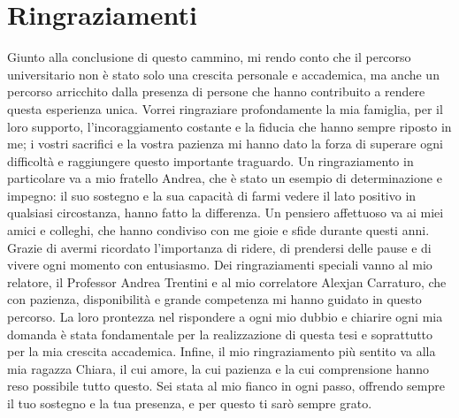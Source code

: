 \documentclass[12pt, a4paper, italian]{report}
\numberwithin{figure}{chapter}
\numberwithin{table}{chapter}
\begin{document}
\cleardoublepage
{}
{} %
\listoffigures

\cleardoublepage
{}
{}
\listoftables

\chapter*{Ringraziamenti}
Giunto alla conclusione di questo cammino, mi rendo conto che il percorso universitario non è stato solo una crescita personale e accademica, ma anche un percorso arricchito dalla presenza di persone che hanno contribuito a rendere questa esperienza unica.
Vorrei ringraziare profondamente la mia famiglia, per il loro supporto, l'incoraggiamento costante e la fiducia che hanno sempre riposto in me; i vostri sacrifici e la vostra pazienza mi hanno dato la forza di superare ogni difficoltà e raggiungere questo importante traguardo.
Un ringraziamento in particolare va a mio fratello Andrea, che è stato un esempio di determinazione e impegno: il suo sostegno e la sua capacità di farmi vedere il lato positivo in qualsiasi circostanza, hanno fatto la differenza.
Un pensiero affettuoso va ai miei amici e colleghi, che hanno condiviso con me gioie e sfide durante questi anni. Grazie di avermi ricordato l'importanza di ridere, di prendersi delle pause e di vivere ogni momento con entusiasmo.
Dei ringraziamenti speciali vanno al mio relatore, il Professor Andrea Trentini e al mio correlatore Alexjan Carraturo, che con pazienza, disponibilità e grande competenza mi hanno guidato in questo percorso. La loro prontezza nel rispondere a ogni mio dubbio e chiarire ogni mia domanda è stata fondamentale per la realizzazione di questa tesi e soprattutto per la mia crescita accademica.
Infine, il mio ringraziamento più sentito va alla mia ragazza Chiara, il cui amore, la cui pazienza e la cui comprensione hanno reso possibile tutto questo. Sei stata al mio fianco in ogni passo, offrendo sempre il tuo sostegno e la tua presenza, e per questo ti sarò sempre grato.

\printbibliography[title={Bibliografia}]
\end{document}
